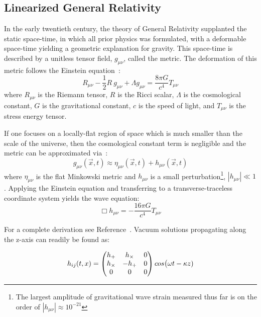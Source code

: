 \documentclass [12pt, proquest]{uwthesis}[2019]
\begin{document}
\subsection{Linearized General Relativity}

In the early twentieth century, the theory of General Relativity supplanted the static space-time, in which all prior physics was formulated, with a deformable space-time yielding a geometric explanation for gravity. This space-time is described by a unitless tensor field, $g_{\mu \nu}$, called the metric. The deformation of this metric follows the Einstein equation~\cite{einsteinGR}:
\begin{equation}
R_{\mu \nu}-\frac{1}{2}R\ g_{\mu \nu}+\Lambda g_{\mu \nu}= \frac{8\pi G}{c^4} T_{\mu \nu}
\end{equation}
where $R_{\mu \nu}$ is the Riemann tensor, $R$ is the Ricci scalar, $\Lambda$ is the cosmological constant, $G$ is the gravitational constant, $c$ is the speed of light, and $T_{\mu \nu}$ is the stress energy tensor.

If one focuses on a locally-flat region of space which is much smaller than the scale of the universe, then the cosmological constant term is negligible and the metric can be approximated via~\cite{GWBook}:
\begin{equation}
g_{\mu \nu}(\vec x,t)\approx\eta_{\mu \nu}(\vec x,t)+h_{\mu \nu}(\vec x,t)
\end{equation}
where $\eta_{\mu \nu}$ is the flat Minkowski metric and $h_{\mu \nu}$ is a small perturbation\footnote{The largest amplitude of gravitational wave strain measured thus far is on the order of $|h_{\mu \nu}|\approx 10^{-21}$\cite{GW150914}}, $|h_{\mu \nu}|\ll 1$. Applying the Einstein equation and transferring to a transverse-traceless coordinate system yields the wave equation:
\begin{equation}
\Box h_{\mu \nu}=-\frac{16 \pi G}{c^4}T_{\mu \nu}
\end{equation}

For a complete derivation see Reference~\cite{GWBook}. Vacuum solutions propagating along the z-axis can readily be found as:

\begin{equation}
h_{ij}(t,x)=\begin{pmatrix} h_+ & h_\times & 0 \\ h_\times & -h_+ & 0 \\ 0 & 0 & 0\end{pmatrix} \\cos\big(\omega t - \kappa z)
\end{equation}
\end{document}

